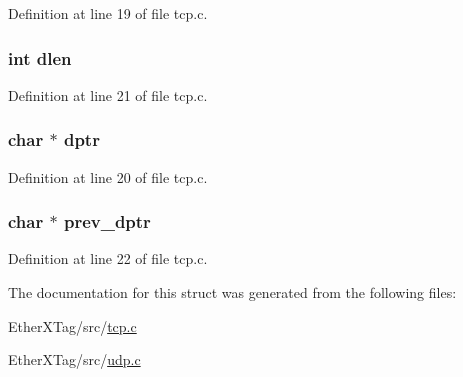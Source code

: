 Definition at line 19 of file tcp.\-c.

\hypertarget{structconnection__type__t_a142672f9be33d53e1ecf96db7104a396}{
\subsubsection[{dlen}]{\setlength{\rightskip}{0pt plus 5cm}int dlen}}\label{structconnection__type__t_a142672f9be33d53e1ecf96db7104a396}


Definition at line 21 of file tcp.\-c.

\hypertarget{structconnection__type__t_a2d9df43d157669dbcc90879f8ee350ff}{
\subsubsection[{dptr}]{\setlength{\rightskip}{0pt plus 5cm}char $\ast$ dptr}}\label{structconnection__type__t_a2d9df43d157669dbcc90879f8ee350ff}


Definition at line 20 of file tcp.\-c.

\hypertarget{structconnection__type__t_a3950706000f1bfe0b448d9b632624521}{
\subsubsection[{prev\-\_\-dptr}]{\setlength{\rightskip}{0pt plus 5cm}char $\ast$ prev\-\_\-dptr}}\label{structconnection__type__t_a3950706000f1bfe0b448d9b632624521}


Definition at line 22 of file tcp.\-c.



The documentation for this struct was generated from the following files\-:\begin{DoxyCompactItemize}
\item 
Ether\-X\-Tag/src/\hyperlink{tcp_8c}{tcp.\-c}\item 
Ether\-X\-Tag/src/\hyperlink{udp_8c}{udp.\-c}\end{DoxyCompactItemize}
